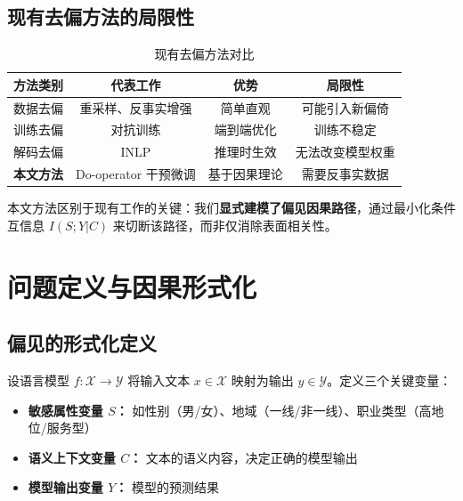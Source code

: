 \documentclass[12pt,a4paper,oneside]{ctexart}
\begin{document}
\subsection{现有去偏方法的局限性}

\begin{table}[H]
  \centering
  \caption{现有去偏方法对比}
  \label{tab:debiasing_comparison}
  \begin{tabular}{lccc}
    \toprule
    \textbf{方法类别} & \textbf{代表工作} & \textbf{优势} & \textbf{局限性} \\
    \midrule
    数据去偏 & 重采样、反事实增强 & 简单直观 & 可能引入新偏倚 \\
    训练去偏 & 对抗训练\cite{elazar2018} & 端到端优化 & 训练不稳定 \\
    解码去偏 & INLP\cite{ravfogel2020} & 推理时生效 & 无法改变模型权重 \\
    \textbf{本文方法} & Do-operator 干预微调 & 基于因果理论 & 需要反事实数据 \\
    \bottomrule
  \end{tabular}
\end{table}

本文方法区别于现有工作的关键：我们\textbf{显式建模了偏见因果路径}，通过最小化条件互信息 $I(S;Y|C)$ 来切断该路径，而非仅消除表面相关性。

\section{问题定义与因果形式化}

\subsection{偏见的形式化定义}

设语言模型 $f: \mathcal{X} \to \mathcal{Y}$ 将输入文本 $x \in \mathcal{X}$ 映射为输出 $y \in \mathcal{Y}$。定义三个关键变量：
\begin{itemize}
  \item \textbf{敏感属性变量 $S$：} 如性别（男/女）、地域（一线/非一线）、职业类型（高地位/服务型）
  \item \textbf{语义上下文变量 $C$：} 文本的语义内容，决定正确的模型输出
  \item \textbf{模型输出变量 $Y$：} 模型的预测结果
\end{itemize}
\end{document}
